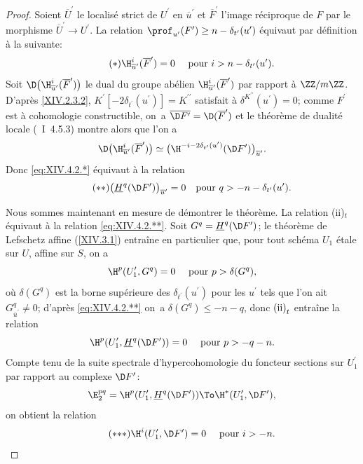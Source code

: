 \begin{proof}
Soient $\overline{U}^{\prime}$ le localis\'e strict de $U^{\prime}$ en $\overline{u}^{\prime}$ et $\overline{F}^{\prime}$ l'image r\'eciproque de $F$ par le morphisme $\overline{U}^{\prime}\to U^{\prime}$. La relation $\prof_{u^{\prime}}(F^{\prime})\geq n-\delta_{t^{\prime}}(u^{\prime})$ \'equivaut par d\'efinition \`a la suivante:
\begin{equation*} \label{eq:XIV.4.2.*} \tag{$*$} {\H_{\overline{u}^{\prime}}^{i}(\overline{F}^{\prime})=0\quad\textrm{ pour }i>n-\delta_{t^{\prime}}(u^{\prime}).}
\end{equation*}
Soit $\D\big(\H_{\overline{u}^{\prime}}^{i}(\overline{F}^{\prime})\big)$ le dual du groupe ab\'elien $\H_{\overline{u}^{\prime}}^{i}(\overline{F}^{\prime})$ par rapport \`a $\ZZ/m\ZZ$. D'apr\`es \ref{XIV.2.3.2}, $K^{\prime}[-2\delta_{t^{\prime}}(u^{\prime})]=K^{\prime\prime}$ satisfait \`a $\delta^{K^{\prime\prime}}(u^{\prime})=0$; comme $F^{\prime}$ est \`a cohomologie constructible, on~a $\overline{\D F^{\prime}}=\D(\overline{F}^{\prime})$ et le th\'eor\`eme de dualit\'e locale (~I~4.5.3) montre alors que l'on a
$$
\D\big(\H_{\overline{u}^{\prime}}^{i}(\overline{F}^{\prime})\big) \simeq\big(\H^{-i-2\delta_{t^{\prime}}(u^{\prime})}(\D F^{\prime})\big)_{\overline{u}^{\prime}}.
$$
Donc \eqref{eq:XIV.4.2.*} \'equivaut \`a la relation
\begin{equation*} \label{eq:XIV.4.2.**} \tag{$**$}
\big(\underline{H}^{q}(\D F^{\prime})\big)_{\overline{u}^{\prime}}=0\quad\text{pour }q>-n-\delta_{t^{\prime}}(u^{\prime}).
\end{equation*}

Nous sommes maintenant en mesure de d\'emontrer le th\'eor\`eme. La relation \textup{(ii)}$_{t}$ \'equivaut \`a la relation \eqref{eq:XIV.4.2.**}. Soit $G^{q}=\underline{H}^{q}(\D F^{\prime})$; le th\'eor\`eme de Lefschetz affine (\ref{XIV.3.1}) entra\^ine en particulier que, pour tout sch\'ema $U_{1}$ \'etale sur $U$, affine sur $S$, on a
$$
\H^{p}(U_{1}^{\prime}, G^{q})=0\quad\textrm{ pour }p>\delta(G^{q}),
$$
o\`u $\delta(G^{q})$ est la borne sup\'erieure des $\delta_{t^{\prime}}(u^{\prime})$ pour les $u^{\prime}$ tels que l'on ait $G_{\overline{u}^{\prime}}^{q}\neq 0$; d'apr\`es \eqref{eq:XIV.4.2.**} on~a $\delta(G^{q})\leq -n-q$, donc $\textup{(ii)}_{t}$ entra\^ine la relation
$$
\H^{p}(U_{1}^{\prime}, \underline{H}^{q}(\D F^{\prime}))=0\quad\textrm{ pour }p>-q-n.
$$
Compte tenu de la suite spectrale d'hypercohomologie du foncteur \og sections sur $U_{1}^{\prime}$\fg par rapport au complexe $\D F^{\prime}$:
$$
\E_{2}^{pq}=\H^{p}(U_{1}^{\prime}, \underline{H}^{q}(\D F^{\prime}))\To\H^{\ast}(U_{1}^{\prime}, \D F^{\prime}),
$$
on obtient la relation
\begin{equation*} \label{eq:XIV.4.2.***} \tag{${*}{*}{*}$}
\H^{i}(U_{1}^{\prime}, \D F^{\prime})=0\quad\textrm{ pour }i>-n.
\end{equation*}


\end{proof}
